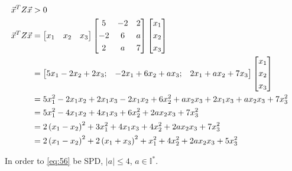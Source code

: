 		\begin{align}
			\vec{x}^{T}Z\vec{x} &> 0& \notag \\
			\vec{x}^{T}Z\vec{x} &= \begin{bmatrix}
				x_{1} & x_{2} & x_{3}
				\end{bmatrix}
				\begin{bmatrix}
					5 & -2 & 2 \\[0.3em]
					-2 & 6 & a \\[0.3em]
					2 & a & 7
				\end{bmatrix}
				\begin{bmatrix}
					x_{1} \\[0.3em]
					x_{2} \\[0.3em]
					x_{3}
				\end{bmatrix}& \\
			&= \begin{bmatrix}
					5x_{1} - 2x_{2} + 2x_{3}; & -2x_{1} + 6x_{2} + ax_{3} ; & 2x_{1} + ax_{2} + 7x_{3}
				\end{bmatrix}
				\begin{bmatrix}
					x_{1} \\[0.3em]
					x_{2} \\[0.3em]
					x_{3}
				\end{bmatrix}& \notag \\
			& = 5x_{1}^{2} - 2x_{1}x_{2} + 2x_{1}x_{3} - 2x_{1}x_{2} + 6x_{2}^{2} + ax_{2}x_{3} + 2x_{1}x_{3} + ax_{2}x_{3} + 7x_{3}^{2} \notag \\
			& = 5x_{1}^{2} - 4x_{1}x_{2} + 4x_{1}x_{3} + 6x_{2}^{2} + 2ax_{2}x_{3} + 7x_{3}^{2} \notag \\
			& = 2\left(x_{1} - x_{2}\right)^{2} + 3x_{1}^{2} + 4x_{1}x_{3} + 4x_{2}^{2} + 2ax_{2}x_{3} + 7x_{3}^{2} \notag \\
			& = 2\left(x_{1} - x_{2}\right)^{2} + 2\left(x_{1}+x_{3}\right)^{2} + x_{1}^{2} + 4x_{2}^{2} + 2ax_{2}x_{3} + 5x_{3}^{2}
		\label{eq:56zxtzx}
		\end{align}

		In order to \cref{eq:56} be SPD, $|a| \leq 4$, $a \in \mathbb{I}^{*}$.